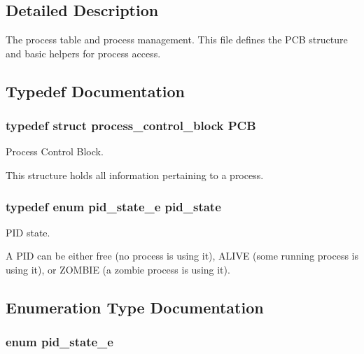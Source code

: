 \subsection{Detailed Description}
The process table and process management. This file defines the P\-C\-B structure and basic helpers for process access. 

\subsection{Typedef Documentation}
\hypertarget{group__proc_gadf327f09ee935cf1734c14e8849f0421}{
\subsubsection[{P\-C\-B}]{\setlength{\rightskip}{0pt plus 5cm}typedef struct {\bf process\-\_\-control\-\_\-block}  {\bf P\-C\-B}}}\label{group__proc_gadf327f09ee935cf1734c14e8849f0421}


Process Control Block. 

This structure holds all information pertaining to a process. \hypertarget{group__proc_gade1eea4d20492c4c97263201145e5097}{
\subsubsection[{pid\-\_\-state}]{\setlength{\rightskip}{0pt plus 5cm}typedef enum {\bf pid\-\_\-state\-\_\-e}  {\bf pid\-\_\-state}}}\label{group__proc_gade1eea4d20492c4c97263201145e5097}


P\-I\-D state. 

A P\-I\-D can be either free (no process is using it), A\-L\-I\-V\-E (some running process is using it), or Z\-O\-M\-B\-I\-E (a zombie process is using it). 

\subsection{Enumeration Type Documentation}
\hypertarget{group__proc_ga4f133ac5f9b2ca9c1446889baee1dc05}{
\subsubsection[{pid\-\_\-state\-\_\-e}]{\setlength{\rightskip}{0pt plus 5cm}enum {\bf pid\-\_\-state\-\_\-e}}}\label{group__proc_ga4f133ac5f9b2ca9c1446889baee1dc05}


